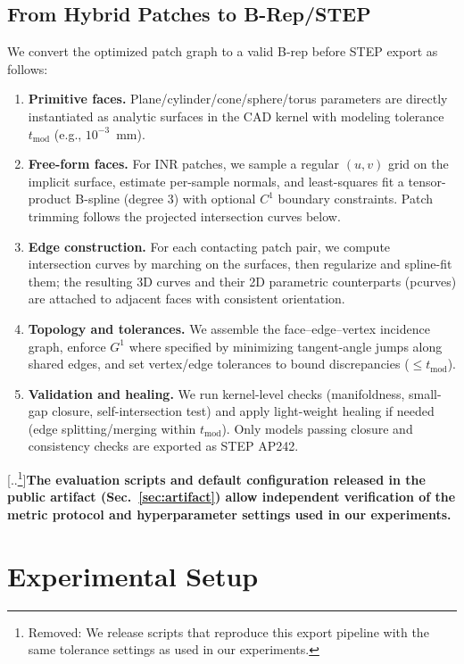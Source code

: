 \documentclass{ieeeaccess}
\providecommand{\DIFaddtex}[1]{{\color{blue}\bfseries #1}} %
\providecommand{\DIFdeltex}[1]{{\color{red}[..\footnote{\color{black}Removed: #1}]}} %
\providecommand{\DIFaddbegin}{} %
\providecommand{\DIFaddend}{} %
\providecommand{\DIFdelbegin}{} %
\providecommand{\DIFdelend}{} %
\providecommand{\DIFadd}[1]{\texorpdfstring{\DIFaddtex{#1}}{#1}} %
\providecommand{\DIFdel}[1]{\texorpdfstring{\DIFdeltex{#1}}{}} %
\begin{document}
\subsection{From Hybrid Patches to B-Rep/STEP}
\label{sec:brep_export}
We convert the optimized patch graph to a valid B-rep before STEP export as follows:
\begin{enumerate}
  \item \textbf{Primitive faces.} Plane/cylinder/cone/sphere/torus parameters are directly instantiated as analytic surfaces in the CAD kernel with modeling tolerance $t_{\mathrm{mod}}$ (e.g., $10^{-3}$~mm).
  \item \textbf{Free-form faces.} For INR patches, we sample a regular $(u,v)$ grid on the implicit surface, estimate per-sample normals, and least-squares fit a tensor-product B-spline (degree 3) with optional $C^1$ boundary constraints. Patch trimming follows the projected intersection curves below.
  \item \textbf{Edge construction.} For each contacting patch pair, we compute intersection curves by marching on the surfaces, then regularize and spline-fit them; the resulting 3D curves and their 2D parametric counterparts (pcurves) are attached to adjacent faces with consistent orientation.
  \item \textbf{Topology and tolerances.} We assemble the face–edge–vertex incidence graph, enforce $G^1$ where specified by minimizing tangent-angle jumps along shared edges, and set vertex/edge tolerances to bound discrepancies ($\le t_{\mathrm{mod}}$).
  \item \textbf{Validation and healing.} We run kernel-level checks (manifoldness, small-gap closure, self-intersection test) and apply light-weight healing if needed (edge splitting/merging within $t_{\mathrm{mod}}$). Only models passing closure and consistency checks are exported as STEP AP242.
\end{enumerate}
\DIFdelbegin \DIFdel{We release scripts that reproduce this export pipeline with the same tolerance settings as used in our experiments.}\DIFdelend \DIFaddbegin \DIFadd{The evaluation scripts and default configuration released in the public artifact (Sec.~\ref{sec:artifact}) allow independent verification of the metric protocol and hyperparameter settings used in our experiments.}\DIFaddend


\section{Experimental Setup}
\label{sec:setup}
\end{document}
